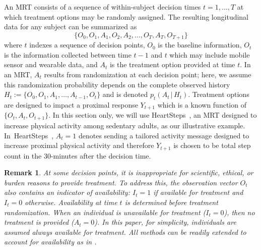 \documentclass[12pt]{article}
\def\given{\, | \,}
\newtheorem{remark}[thm]{Remark}%
\newcommand{\zw}[1]{\textcolor{blue}{[\textit{ZW: #1}]}}
\begin{document}
An MRT consists of a sequence of within-subject decision times $t=1,\ldots,T$ at which treatment options may be randomly assigned.  The resulting longitudinal data for any subject can be summarized as
$$
\{ O_0, O_1, A_1, O_2, A_2, \ldots, O_T, A_T, O_{T+1} \}
$$
where $t$ indexes a sequence of decision points, $O_0$ is the baseline information, $O_t$ is the information collected between time $t-1$ and $t$ which may include mobile sensor and wearable data, and $A_t$ is the treatment option provided at time $t$.  In an MRT, $A_t$ results from randomization at each decision point; here, we assume this randomization probability depends on the complete observed history $H_t := \{ O_0, O_1, A_1, \ldots, A_{t-1}, O_t \}$ and is denoted $p_t (A_t \given H_t)$. Treatment options are designed to impact a proximal response $Y_{t+1}$ which is a known function of $\{ O_t, A_t, O_{t+1}\}$.
In this section only, we will use HeartSteps~\citep{HeartSteps2018}, an MRT designed to increase physical activity among sedentary adults, as our illustrative example.
In~HeartSteps~\citep{HeartSteps2018},  $A_t = 1$ denotes sending a tailored activity message designed to increase proximal physical activity and therefore $Y_{t+1}$ is chosen to be total step count in the 30-minutes after the decision time.

\begin{remark} \normalfont
At some decision points, it is inappropriate for scientific, ethical, or burden reasons to provide treatment. To address this, the observation vector $O_t$ also contains an indicator of availability:
$I_t = 1$ if available for treatment and $I_t = 0$ otherwise. Availability at time $t$ is determined before treatment randomization. When an individual is unavailable for treatment ($I_t = 0$), then no treatment is provided ($A_t = 0$). In this paper, for simplicity, individuals are assumed always available for treatment. All methods can be readily extended to account for availability as in \citet{Boruvkaetal}.


\end{remark}
\end{document}
